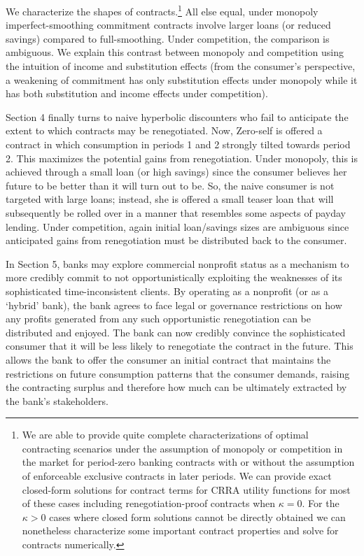 \documentclass[11pt,english]{article}
\theoremstyle{plain}
\theoremstyle{definition}
\begin{document}
We characterize the shapes of contracts.\footnote{We are able to provide quite complete characterizations of optimal
contracting scenarios under the assumption of monopoly or competition
in the market for period-zero banking contracts with or without the
assumption of enforceable exclusive contracts in later periods. We
can provide exact closed-form solutions for contract terms for CRRA
utility functions for most of these cases including renegotiation-proof
contracts when $\kappa=0$. For the $\kappa>0$ cases where closed
form solutions cannot be directly obtained we can nonetheless characterize
some important contract properties and solve for contracts numerically.} All else equal, under monopoly imperfect-smoothing commitment contracts
involve larger loans (or reduced savings) compared to full-smoothing.
Under competition, the comparison is ambiguous. We explain this contrast
between monopoly and competition using the intuition of income and
substitution effects (from the consumer's perspective, a weakening
of commitment has only substitution effects under monopoly while it
has both substitution and income effects under competition).

Section 4 finally turns to naive hyperbolic discounters who fail to
anticipate the extent to which contracts may be renegotiated. Now,
Zero-self is offered a contract in which consumption in periods 1
and 2 strongly tilted towards period 2. This maximizes the potential
gains from renegotiation. Under monopoly, this is achieved through
a small loan (or high savings) since the consumer believes her future
to be better than it will turn out to be. So, the naive consumer is
not targeted with large loans; instead, she is offered a small teaser
loan that will subsequently be rolled over in a manner that resembles
some aspects of payday lending. Under competition, again initial loan/savings
sizes are ambiguous since anticipated gains from renegotiation must
be distributed back to the consumer.

In Section 5, banks may explore commercial nonprofit status as a mechanism
to more credibly commit to not opportunistically exploiting the weaknesses
of its sophisticated time-inconsistent clients. By operating as a
nonprofit (or as a `hybrid' bank), the bank agrees to face legal or
governance restrictions on how any profits generated from any such
opportunistic renegotiation can be distributed and enjoyed. The bank
can now credibly convince the sophisticated consumer that it will
be less likely to renegotiate the contract in the future. This allows
the bank to offer the consumer an initial contract that maintains
the restrictions on future consumption patterns that the consumer
demands, raising the contracting surplus and therefore how much can
be ultimately extracted by the bank's stakeholders.
\end{document}
